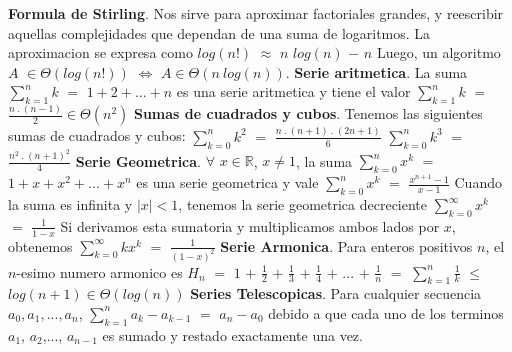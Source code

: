 \documentclass[10pt,a4paper]{article}
\begin{document}
\textbf{Formula de Stirling}. Nos sirve para aproximar factoriales grandes, y reescribir aquellas complejidades que dependan de una suma de logaritmos. La aproximacion se expresa como $log(n!)$ $\approx$ $n$ $log(n)$ $-$ $n$
\newline
\newline
Luego, un algoritmo $A$ $\in \Theta(log(n!))$ $\Leftrightarrow$ $A \in \Theta(n~log(n))$.
\newline
\newline
\textbf{Serie aritmetica}. La suma $\displaystyle \sum_{k=1}^{n} k$ $=$ $1 + 2 + ... + n$ es una serie aritmetica y tiene el valor $\displaystyle \sum_{k=1}^{n} k$ $=$ $\displaystyle \frac{n ~.~ (n-1)}{2} \in \Theta(n^{2})$
\newline
\newline
\newline
\textbf{Sumas de cuadrados y cubos}. Tenemos las siguientes sumas de cuadrados y cubos:
\newline
\newline
$\displaystyle \sum_{k=0}^{n} k^{2}$ $=$ $\displaystyle \frac{n ~.~ (n+1) ~.~ (2n+1)}{6}$
\newline
\newline
\newline
$\displaystyle \sum_{k=0}^{n} k^{3}$ $=$ $\displaystyle \frac{n^{2} ~.~ (n+1)^{2}}{4}$
\newline
\newline
\newline
\textbf{Serie Geometrica}. $\forall$ $x \in \mathbb{R}$, $x \neq 1$, la suma $\displaystyle \sum_{k=0}^{n} x^{k}$ $=$ $1 + x + x^{2} + ... + x^{n}$ es una serie geometrica y vale $\displaystyle \sum_{k=0}^{n} x^{k}$ $=$ $\displaystyle \frac{x^{n+1} - 1}{x-1}$ 
\newline
\newline
\newline
Cuando la suma es infinita y $|x| < 1$, tenemos la serie geometrica decreciente $\displaystyle \sum_{k=0}^{\infty} x^{k}$ $=$ $\displaystyle \frac{1}{1-x}$
\newline
\newline
\newline
Si derivamos esta sumatoria y multiplicamos ambos lados por $x$, obtenemos $\displaystyle \sum_{k=0}^{\infty} kx^{k}$ $=$ $\displaystyle \frac{1}{(1-x)^{2}}$
\newline
\newline
\newline
\textbf{Serie Armonica}. Para enteros positivos $n$, el $n$-esimo numero armonico es $H_{n}$ $=$ $1$ $+$ $\displaystyle \frac{1}{2}$ $+$ $\displaystyle \frac{1}{3}$ $+$ $\displaystyle \frac{1}{4}$ $+$ ... $+$ $\displaystyle \frac{1}{n}$ $=$ $\displaystyle \sum_{k=1}^{n} \displaystyle \frac{1}{k}$ $\leq$ $log(n+1) \in \Theta(log(n))$ 
\newline
\newline
\newline
\textbf{Series Telescopicas}. Para cualquier secuencia $a_{0},a_{1},...,a_{n}$, $\displaystyle \sum_{k=1}^{n} a_{k} - a_{k-1}$ $=$ $a_{n} - a_{0}$ debido a que cada uno de los terminos $a_{1}$, $a_{2}$,..., $a_{n-1}$ es sumado y restado exactamente una vez.
\newpage
\end{document}

